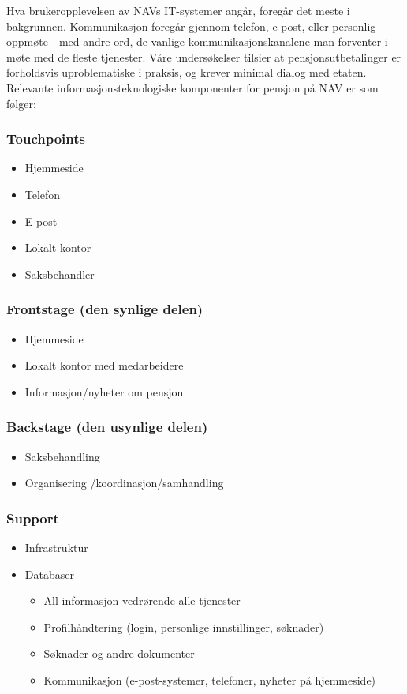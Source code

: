 \documentclass[informationsecurity]{gucmasterproject}
\begin{document}
Hva brukeropplevelsen av NAVs IT-systemer angår, foregår det meste i bakgrunnen. Kommunikasjon foregår gjennom telefon, e-post, eller personlig oppmøte - med andre ord, de vanlige kommunikasjonskanalene man forventer i møte med de fleste tjenester. Våre undersøkelser tilsier at pensjonsutbetalinger er forholdsvis uproblematiske i praksis, og krever minimal dialog med etaten. Relevante informasjonsteknologiske komponenter for pensjon på NAV er som følger:

\subsubsection{Touchpoints}
\begin{itemize}
\item Hjemmeside
\item Telefon
\item E-post
\item Lokalt kontor
\item Saksbehandler
\end{itemize}

\subsubsection{Frontstage (den synlige delen)}
\begin{itemize}
\item Hjemmeside
\item Lokalt kontor med medarbeidere
\item Informasjon/nyheter om pensjon
\end{itemize}

\subsubsection{Backstage (den usynlige delen)}
\begin{itemize}
\item Saksbehandling
\item Organisering /koordinasjon/samhandling
\end{itemize}

\subsubsection{Support}
\begin{itemize}
\item Infrastruktur
\item Databaser
	\begin{itemize}
	\item All informasjon vedrørende alle tjenester
	\item Profilhåndtering (login, personlige innstillinger, søknader)
	\item Søknader og andre dokumenter
	\item Kommunikasjon (e-post-systemer, telefoner, nyheter på hjemmeside)
	\end{itemize}
\end{itemize}
\end{document}
